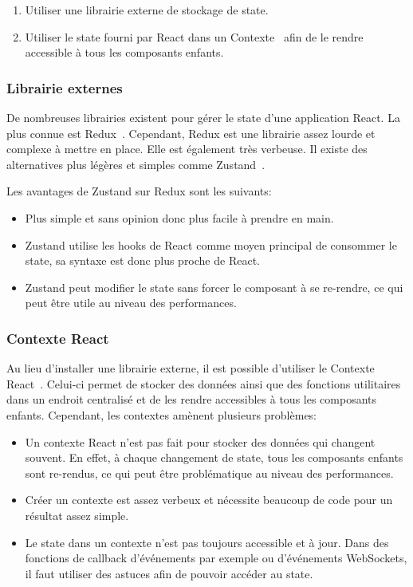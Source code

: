 \begin{enumerate}
  \item Utiliser une librairie externe de stockage de state.
  \item Utiliser le state fourni par React dans un Contexte~\cite{react-context} afin de le rendre accessible à tous les composants enfants.
\end{enumerate}

\subsubsection{Librairie externes}

De nombreuses librairies existent pour gérer le state d'une application React. La plus connue est Redux~\cite{react-redux}. Cependant, Redux est une librairie assez lourde et complexe à mettre en place. Elle est également très verbeuse. Il existe des alternatives plus légères et simples comme Zustand~\cite{zustand}.

Les avantages de Zustand sur Redux sont les suivants:
\begin{itemize}
  \item Plus simple et sans opinion donc plus facile à prendre en main.
  \item Zustand utilise les hooks de React comme moyen principal de consommer le state, sa syntaxe est donc plus proche de React.
  \item Zustand peut modifier le state sans forcer le composant à se re-rendre, ce qui peut être utile au niveau des performances.
\end{itemize}

\subsubsection{Contexte React}

Au lieu d'installer une librairie externe, il est possible d'utiliser le Contexte React~\cite{react-context}. Celui-ci permet de stocker des données ainsi que des fonctions utilitaires dans un endroit centralisé et de les rendre accessibles à tous les composants enfants. Cependant, les contextes amènent plusieurs problèmes:

\begin{itemize}
  \item Un contexte React n'est pas fait pour stocker des données qui changent souvent. En effet, à chaque changement de state, tous les composants enfants sont re-rendus, ce qui peut être problématique au niveau des performances.
  \item Créer un contexte est assez verbeux et nécessite beaucoup de code pour un résultat assez simple.
  \item Le state dans un contexte n'est pas toujours accessible et à jour. Dans des fonctions de callback d'événements par exemple ou d'événements WebSockets, il faut utiliser des astuces afin de pouvoir accéder au state.
\end{itemize}

